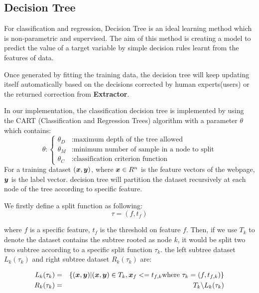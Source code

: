\subsection{Decision Tree}
For classification and regression, Decision Tree is an ideal learning method which is non-parametric and supervised. The aim of this method is creating a model to predict the value of a target variable by simple decision rules learnt from the features of data\cite{breiman1984classification,quinlan2014c4,friedman2001elements}. 

Once generated by fitting the training data, the decision tree will keep updating itself automatically based on the decisions corrected by human experts(users) or the returned correction from \textbf{Extractor}.

In our implementation, the classification decision tree is implemented by using the CART (Classification and Regression Trees) algorithm\cite{quinlan2014c4,friedman2001elements} with a parameter $\theta$ which contains:
\begin{equation}
	\theta : \left\{
		\begin{aligned}
		\theta_D & :  \mbox{maximum depth of the tree allowed} \\
		\theta_M & :  \mbox{minimum number of sample in a node to split} \\
		\theta_C & :  \mbox{classification criterion function}
		\end{aligned}
	\right.
\end{equation}
For a training dataset $(\boldsymbol{x},\boldsymbol{y})$, where $\boldsymbol{x} \in R^n$ is the feature vectors of the webpage, $\boldsymbol{y}$ is the label vector. decision tree will partition the dataset recursively at each node of the tree according to specific feature.

We firstly define a split function as following:
\begin{equation}
	\tau = (f,t_{f})
\end{equation}

where $f$ is a specific feature, $t_{f}$ is the threshold on feature $f$. Then, if we use $T_k$ to denote the dataset contains the subtree rooted as node $k$, it would be split two two subtree according to a specific split function $\tau_k$. the left subtree dataset $L_k(\tau_k)$ and right subtree dataset $R_k(\tau_k)$ are:

\begin{eqnarray}
	L_k(\tau_k) &=& \{ (\boldsymbol{x},\boldsymbol{y}) \vert (\boldsymbol{x},\boldsymbol{y}) \in T_k, \boldsymbol{x}_f <= t_{f,k} \mbox{where } \tau_k = (f,t_{f,k}) \}\\
	R_k(\tau_k) &=& T_k \backslash L_k(\tau_k)
\end{eqnarray}

